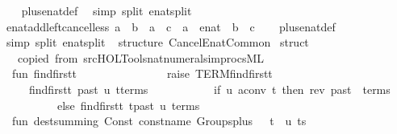 \begin{isabellebody}
%
\isadelimproof
\ \ %
\endisadelimproof
%
\isatagproof
{}\isamarkupfalse%
\ plus{\isacharunderscore}enat{\isacharunderscore}def\ \isamarkupfalse%
\ {\isacharparenleft}simp\ split{\isacharcolon}\ enat{\isachardot}split{\isacharparenright}%
\endisatagproof
{\isafoldproof}%
%
\isadelimproof
\isanewline
%
\endisadelimproof
\isanewline
{}\isamarkupfalse%
\ enat{\isacharunderscore}add{\isacharunderscore}left{\isacharunderscore}cancel{\isacharunderscore}less{\isacharcolon}\ {\isachardoublequoteopen}a\ {\isacharplus}\ b\ {\isacharless}\ a\ {\isacharplus}\ c\ {\isasymlongleftrightarrow}\ a\ {\isasymnoteq}\ {\isacharparenleft}{\isasyminfinity}{\isacharcolon}{\isacharcolon}enat{\isacharparenright}\ {\isasymand}\ b\ {\isacharless}\ c{\isachardoublequoteclose}\isanewline
%
\isadelimproof
\ \ %
\endisadelimproof
%
\isatagproof
{}\isamarkupfalse%
\ plus{\isacharunderscore}enat{\isacharunderscore}def\ \isamarkupfalse%
\ {\isacharparenleft}simp\ split{\isacharcolon}\ enat{\isachardot}split{\isacharparenright}%
\endisatagproof
{\isafoldproof}%
%
\isadelimproof
\isanewline
%
\endisadelimproof
%
\isadelimML
\isanewline
%
\endisadelimML
%
\isatagML
{}\isamarkupfalse%
\ {\isacartoucheopen}\isanewline
structure\ Cancel{\isacharunderscore}Enat{\isacharunderscore}Common\ {\isacharequal}\isanewline
struct\isanewline
\ \ {\isacharparenleft}{\isacharasterisk}\ copied\ from\ src{\isacharslash}HOL{\isacharslash}Tools{\isacharslash}nat{\isacharunderscore}numeral{\isacharunderscore}simprocs{\isachardot}ML\ {\isacharasterisk}{\isacharparenright}\isanewline
\ \ fun\ find{\isacharunderscore}first{\isacharunderscore}t\ {\isacharunderscore}\ \ \ \ {\isacharunderscore}\ {\isacharbrackleft}{\isacharbrackright}\ \ \ \ \ \ \ \ \ {\isacharequal}\ raise\ TERM{\isacharparenleft}{\isachardoublequote}find{\isacharunderscore}first{\isacharunderscore}t{\isachardoublequote}{\isacharcomma}\ {\isacharbrackleft}{\isacharbrackright}{\isacharparenright}\isanewline
\ \ \ \ {\isacharbar}\ find{\isacharunderscore}first{\isacharunderscore}t\ past\ u\ {\isacharparenleft}t{\isacharcolon}{\isacharcolon}terms{\isacharparenright}\ {\isacharequal}\isanewline
\ \ \ \ \ \ \ \ \ \ if\ u\ aconv\ t\ then\ {\isacharparenleft}rev\ past\ {\isacharat}\ terms{\isacharparenright}\isanewline
\ \ \ \ \ \ \ \ \ \ else\ find{\isacharunderscore}first{\isacharunderscore}t\ {\isacharparenleft}t{\isacharcolon}{\isacharcolon}past{\isacharparenright}\ u\ terms\isanewline
\isanewline
\ \ fun\ dest{\isacharunderscore}summing\ {\isacharparenleft}Const\ {\isacharparenleft}{\isacharat}{\isacharbraceleft}const{\isacharunderscore}name\ Groups{\isachardot}plus{\isacharbraceright}{\isacharcomma}\ {\isacharunderscore}{\isacharparenright}\ {\isachardollar}\ t\ {\isachardollar}\ u{\isacharcomma}\ ts{\isacharparenright}\ {\isacharequal}\isanewline

\end{isabellebody}
